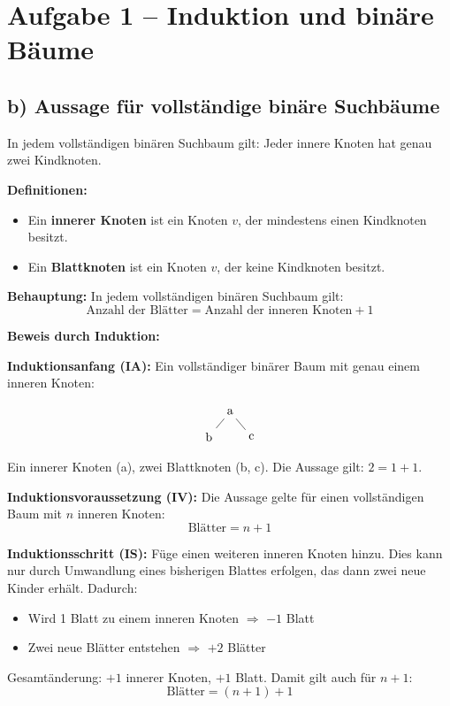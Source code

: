 \section*{Aufgabe 1 – Induktion und binäre Bäume}

\subsection*{b) Aussage für vollständige binäre Suchbäume}

In jedem vollständigen binären Suchbaum gilt: Jeder innere Knoten hat genau zwei Kindknoten.

\textbf{Definitionen:}
\begin{itemize}
    \item Ein \textbf{innerer Knoten} ist ein Knoten $v$, der mindestens einen Kindknoten besitzt.
    \item Ein \textbf{Blattknoten} ist ein Knoten $v$, der keine Kindknoten besitzt.
\end{itemize}

\textbf{Behauptung:} In jedem vollständigen binären Suchbaum gilt:
\[
\text{Anzahl der Blätter} = \text{Anzahl der inneren Knoten} + 1
\]

\textbf{Beweis durch Induktion:}

\textbf{Induktionsanfang (IA):} Ein vollständiger binärer Baum mit genau einem inneren Knoten:

\[
\begin{tikzpicture}[scale=0.6, level distance=1.2cm, sibling distance=2cm]
\node{a}
	child {node {b}}
	child {node {c}};
\end{tikzpicture}
\]

Ein innerer Knoten (a), zwei Blattknoten (b, c). Die Aussage gilt: $2 = 1 + 1$.

\textbf{Induktionsvoraussetzung (IV):} Die Aussage gelte für einen vollständigen Baum mit $n$ inneren Knoten:
\[
\text{Blätter} = n + 1
\]

\textbf{Induktionsschritt (IS):} Füge einen weiteren inneren Knoten hinzu. Dies kann nur durch Umwandlung eines bisherigen Blattes erfolgen, das dann zwei neue Kinder erhält. Dadurch:
\begin{itemize}
    \item Wird 1 Blatt zu einem inneren Knoten $\Rightarrow$ $-1$ Blatt
    \item Zwei neue Blätter entstehen $\Rightarrow$ $+2$ Blätter
\end{itemize}

Gesamtänderung: $+1$ innerer Knoten, $+1$ Blatt. Damit gilt auch für $n+1$:
\[
\text{Blätter} = (n+1) + 1
\]

